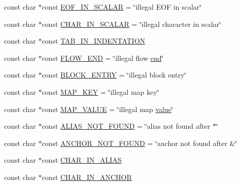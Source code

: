 \begin{DoxyCompactItemize}
\item 
const char $\ast$const \mbox{\hyperlink{namespace_y_a_m_l_1_1_error_msg_ad034e48a4f09b9dfef55b0a6ff319074}{E\+O\+F\+\_\+\+I\+N\+\_\+\+S\+C\+A\+L\+AR}} = \char`\"{}illegal E\+OF in scalar\char`\"{}
\item 
const char $\ast$const \mbox{\hyperlink{namespace_y_a_m_l_1_1_error_msg_aadf2e2d3ddb9e7ded9543c198bbd9755}{C\+H\+A\+R\+\_\+\+I\+N\+\_\+\+S\+C\+A\+L\+AR}} = \char`\"{}illegal character in scalar\char`\"{}
\item 
const char $\ast$const \mbox{\hyperlink{namespace_y_a_m_l_1_1_error_msg_a4a1f80e85526488a47d0aec400985ba1}{T\+A\+B\+\_\+\+I\+N\+\_\+\+I\+N\+D\+E\+N\+T\+A\+T\+I\+ON}}
\item 
const char $\ast$const \mbox{\hyperlink{namespace_y_a_m_l_1_1_error_msg_a72672ee0f08be49c4a3c0aecca3c3344}{F\+L\+O\+W\+\_\+\+E\+ND}} = \char`\"{}illegal flow \mbox{\hyperlink{glad_8h_a432111147038972f06e049e18a837002}{end}}\char`\"{}
\item 
const char $\ast$const \mbox{\hyperlink{namespace_y_a_m_l_1_1_error_msg_afe3775f0ffe2627b2d584107815c47e3}{B\+L\+O\+C\+K\+\_\+\+E\+N\+T\+RY}} = \char`\"{}illegal block entry\char`\"{}
\item 
const char $\ast$const \mbox{\hyperlink{namespace_y_a_m_l_1_1_error_msg_a919b50dc5f3e58b63a2f540747159653}{M\+A\+P\+\_\+\+K\+EY}} = \char`\"{}illegal map key\char`\"{}
\item 
const char $\ast$const \mbox{\hyperlink{namespace_y_a_m_l_1_1_error_msg_a56712ea8da96c324adb4ab4e17c09880}{M\+A\+P\+\_\+\+V\+A\+L\+UE}} = \char`\"{}illegal map \mbox{\hyperlink{glad_8h_a03aff08f73d7fde3d1a08e0abd8e84fa}{value}}\char`\"{}
\item 
const char $\ast$const \mbox{\hyperlink{namespace_y_a_m_l_1_1_error_msg_abff2316027a5233e3196dcb840f5310b}{A\+L\+I\+A\+S\+\_\+\+N\+O\+T\+\_\+\+F\+O\+U\+ND}} = \char`\"{}alias not found after $\ast$\char`\"{}
\item 
const char $\ast$const \mbox{\hyperlink{namespace_y_a_m_l_1_1_error_msg_abcd13c9bbf9d245d95aa8d64c677bb1e}{A\+N\+C\+H\+O\+R\+\_\+\+N\+O\+T\+\_\+\+F\+O\+U\+ND}} = \char`\"{}anchor not found after \&\char`\"{}
\item 
const char $\ast$const \mbox{\hyperlink{namespace_y_a_m_l_1_1_error_msg_ab4b6c0de1afaf2752685ca275f5a02c8}{C\+H\+A\+R\+\_\+\+I\+N\+\_\+\+A\+L\+I\+AS}}
\item 
const char $\ast$const \mbox{\hyperlink{namespace_y_a_m_l_1_1_error_msg_ab4e086860dc61e286d7022e58e6f7af8}{C\+H\+A\+R\+\_\+\+I\+N\+\_\+\+A\+N\+C\+H\+OR}}

\end{DoxyCompactItemize}
